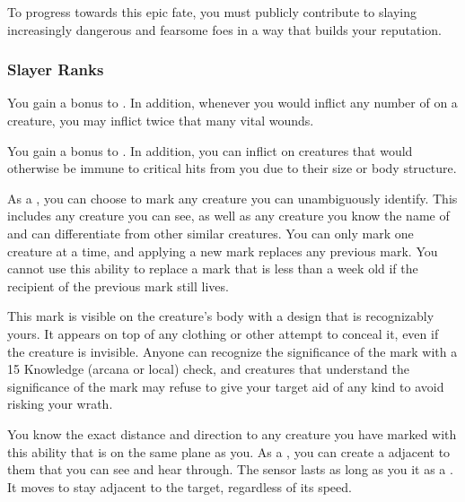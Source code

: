          To progress towards this epic fate, you must publicly contribute to slaying increasingly dangerous and fearsome foes in a way that builds your reputation.

        \subsubsection{Slayer Ranks}
             You gain a  bonus to .
            In addition, whenever you would inflict any number of  on a creature, you may inflict twice that many vital wounds.

             You gain a  bonus to .
            In addition, you can inflict  on creatures that would otherwise be immune to critical hits from you due to their size or body structure.

             As a , you can choose to mark any creature you can unambiguously identify.
            This includes any creature you can see, as well as any creature you know the name of and can differentiate from other similar creatures.
            You can only mark one creature at a time, and applying a new mark replaces any previous mark.
            You cannot use this ability to replace a mark that is less than a week old if the recipient of the previous mark still lives.

            This mark is visible on the creature's body with a design that is recognizably yours.
            It appears on top of any clothing or other attempt to conceal it, even if the creature is invisible.
            Anyone can recognize the significance of the mark with a  15 Knowledge (arcana or local) check, and creatures that understand the significance of the mark may refuse to give your target aid of any kind to avoid risking your wrath.

            You know the exact distance and direction to any creature you have marked with this ability that is on the same plane as you.
            As a , you can create a  adjacent to them that you can see and hear through.
            The sensor lasts as long as you  it as a .
            It moves to stay adjacent to the target, regardless of its speed.

